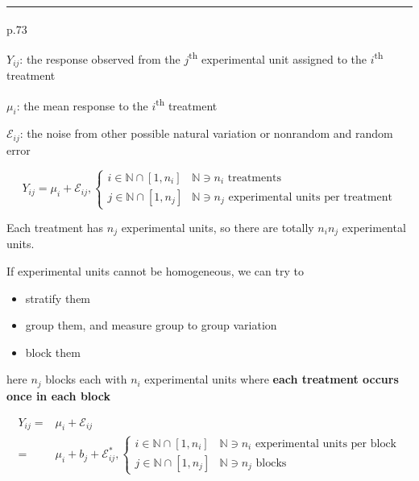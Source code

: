 \documentclass[
]{book}
\providecommand{\tightlist}{%
  \setlength{\itemsep}{0pt}\setlength{\parskip}{0pt}}
\theoremstyle{definition}
\theoremstyle{definition}
\theoremstyle{definition}
\theoremstyle{definition}
\theoremstyle{remark}
\begin{document}
\begin{center}\rule{0.5\linewidth}{0.5pt}\end{center}

\textsuperscript{} p.73

\(Y_{\scriptscriptstyle{ij}}\): the response observed from the \(j\)\textsuperscript{th} experimental unit assigned to the \(i\)\textsuperscript{th} treatment

\(\mu_{\scriptscriptstyle{i}}\): the mean response to the \(i\)\textsuperscript{th} treatment

\(\mathcal{E}_{\scriptscriptstyle{ij}}\): the noise from other possible natural variation or nonrandom and random error

\[
Y_{{\scriptscriptstyle i}{\scriptscriptstyle j}}=\mu_{{\scriptscriptstyle i}}+\mathcal{E}_{{\scriptscriptstyle i}{\scriptscriptstyle j}},\begin{cases}
i\in\mathbb{N}\cap\left[1,n_{{\scriptscriptstyle i}}\right] & \mathbb{N}\ni n_{{\scriptscriptstyle i}}\text{ treatments}\\
j\in\mathbb{N}\cap\left[1,n_{{\scriptscriptstyle j}}\right] & \mathbb{N}\ni n_{{\scriptscriptstyle j}}\text{ experimental units per treatment}
\end{cases}
\]

Each treatment has \(n_{j}\) experimental units, so there are totally \(n_{i}n_{j}\) experimental units.

If experimental units cannot be homogeneous, we can try to

\begin{itemize}
\tightlist
\item
  stratify them
\item
  group them, and measure group to group variation
\item
  block them
\end{itemize}

here \(n_{j}\) blocks each with \(n_{i}\) experimental units where \textbf{each treatment occurs once in each block}

\[
\begin{aligned}
Y_{{\scriptscriptstyle i}{\scriptscriptstyle j}}= & \mu_{{\scriptscriptstyle i}}+\mathcal{E}_{{\scriptscriptstyle i}{\scriptscriptstyle j}}\\
= & \mu_{{\scriptscriptstyle i}}+b_{{\scriptscriptstyle j}}+\mathcal{E}_{{\scriptscriptstyle i}{\scriptscriptstyle j}}^{*},\begin{cases}
i\in\mathbb{N}\cap\left[1,n_{{\scriptscriptstyle i}}\right] & \mathbb{N}\ni n_{{\scriptscriptstyle i}}\text{ experimental units per block}\\
j\in\mathbb{N}\cap\left[1,n_{{\scriptscriptstyle j}}\right] & \mathbb{N}\ni n_{{\scriptscriptstyle j}}\text{ blocks}
\end{cases}
\end{aligned}
\]
\end{document}
